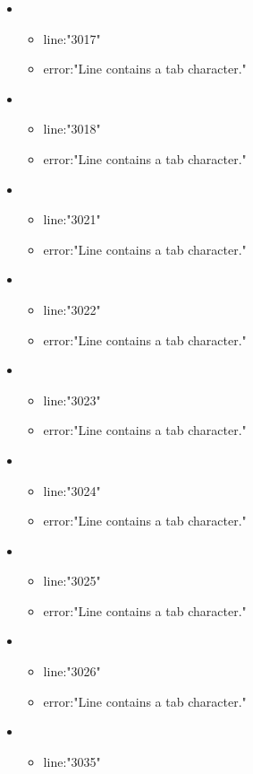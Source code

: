 \begin{itemize}
	\item 
	\begin{itemize} 
		\item line:"3017" 
		\item error:"Line contains a tab character." 
	\end{itemize}
	\item 
	\begin{itemize} 
		\item line:"3018" 
		\item error:"Line contains a tab character." 
	\end{itemize}
	\item 
	\begin{itemize} 
		\item line:"3021" 
		\item error:"Line contains a tab character." 
	\end{itemize}
	\item 
	\begin{itemize} 
		\item line:"3022" 
		\item error:"Line contains a tab character." 
	\end{itemize}
	\item 
	\begin{itemize} 
		\item line:"3023" 
		\item error:"Line contains a tab character." 
	\end{itemize}
	\item 
	\begin{itemize} 
		\item line:"3024" 
		\item error:"Line contains a tab character." 
	\end{itemize}
	\item 
	\begin{itemize} 
		\item line:"3025" 
		\item error:"Line contains a tab character." 
	\end{itemize}
	\item 
	\begin{itemize} 
		\item line:"3026" 
		\item error:"Line contains a tab character." 
	\end{itemize}
	\item 
	\begin{itemize} 
		\item line:"3035" 

\end{itemize}
\end{itemize}
